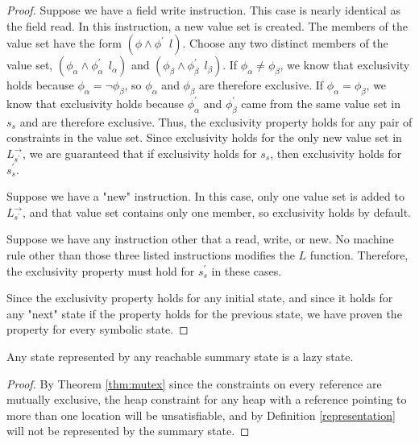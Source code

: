 \begin{proof}
Suppose we have a field write instruction. This case is nearly identical as the field read. In this instruction, a new value set is created. The members of the value set have the form $(\phi\wedge \phi^\prime\ \ l)$. Choose any two distinct members of the value set, $(\phi_\alpha \wedge \phi_\alpha^\prime\ \ l_\alpha)$ and $(\phi_\beta \wedge \phi_\beta^\prime\ \ l_\beta)$. If $\phi_\alpha \ne \phi_\beta$, we know that exclusivity holds because $\phi_\alpha = \neg \phi_\beta$, so $\phi_\alpha$ and $\phi_\beta$ are therefore exclusive. If $\phi_\alpha = \phi_\beta$, we know that exclusivity holds because $\phi_\alpha^\prime$ and $\phi_\beta^\prime$ came from the same value set in $s_s$ and are therefore exclusive. Thus, the exclusivity property holds for any pair of constraints in the value set. Since exclusivity holds for the only new value set in $L_{s^\prime}^\rightarrow$, we are guaranteed that if exclusivity holds for $s_s$, then exclusivity holds for $s_s^\prime$.

Suppose we have a "new" instruction. In this case, only one value set is added to $L_{s^\prime}^\rightarrow$, and that value set contains only one member, so exclusivity holds by default.

Suppose we have any instruction other that a read, write, or new. No machine rule other than those three listed instructions modifies the $L$ function. Therefore, the exclusivity property must hold for $s_s^\prime$ in these cases.

Since the exclusivity property holds for any initial state, and since it holds for any "next" state if the property holds for the previous state, we have proven the property for every symbolic state.
\end{proof}

\begin{corollary}
Any state represented by any reachable summary state is a lazy state.
\end{corollary}

\begin{proof}
By Theorem \ref{thm:mutex} since the constraints on every reference are mutually exclusive, the heap constraint for any heap with a reference pointing to more than one location will be unsatisfiable, and by Definition \ref{representation} will not be represented by the summary state.
\end{proof}


